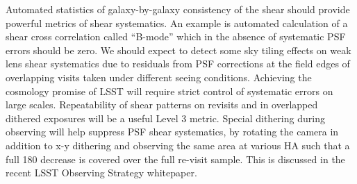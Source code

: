 \documentclass[SE,toc,lsstdraft]{lsstdoc}
\begin{document}
Automated statistics of galaxy-by-galaxy consistency of the shear should provide powerful metrics of shear systematics.  An example is automated calculation of a shear cross correlation called ``B-mode'' which in the absence of systematic PSF errors should be zero. We should expect to detect some sky tiling effects on weak lens shear systematics due to residuals from PSF corrections at the field edges of overlapping visits taken under different seeing conditions. Achieving the cosmology promise of LSST will require strict control of systematic errors on large scales. Repeatability of shear patterns on revisits and in overlapped dithered exposures will be a useful Level 3 metric.
Special dithering during observing will help suppress PSF shear systematics, by rotating the camera in addition to x-y dithering and observing the same area at various HA such that a full 180 decrease is covered over the full re-visit sample. This is discussed in the recent LSST Observing Strategy whitepaper.  %


\end{document}
